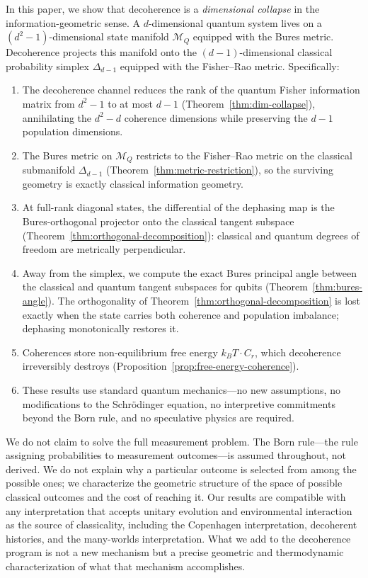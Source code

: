 \documentclass[12pt,a4paper]{article}
\theoremstyle{definition}
\theoremstyle{remark}
\begin{document}
In this paper, we show that decoherence is a \emph{dimensional collapse} in the information-geometric sense. A $d$-dimensional quantum system lives on a $(d^2-1)$-dimensional state manifold $\mathcal{M}_Q$ equipped with the Bures metric. Decoherence projects this manifold onto the $(d-1)$-dimensional classical probability simplex $\Delta_{d-1}$ equipped with the Fisher--Rao metric. Specifically:
\begin{enumerate}
\item The decoherence channel reduces the rank of the quantum Fisher information matrix from $d^2-1$ to at most $d-1$ (Theorem~\ref{thm:dim-collapse}), annihilating the $d^2-d$ coherence dimensions while preserving the $d-1$ population dimensions.
\item The Bures metric on $\mathcal{M}_Q$ restricts to the Fisher--Rao metric on the classical submanifold $\Delta_{d-1}$ (Theorem~\ref{thm:metric-restriction}), so the surviving geometry is exactly classical information geometry.
\item At full-rank diagonal states, the differential of the dephasing map is the Bures-orthogonal projector onto the classical tangent subspace (Theorem~\ref{thm:orthogonal-decomposition}): classical and quantum degrees of freedom are metrically perpendicular.
\item Away from the simplex, we compute the exact Bures principal angle between the classical and quantum tangent subspaces for qubits (Theorem~\ref{thm:bures-angle}).  The orthogonality of Theorem~\ref{thm:orthogonal-decomposition} is lost exactly when the state carries both coherence and population imbalance; dephasing monotonically restores it.
\item Coherences store non-equilibrium free energy $k_B T \cdot C_r$, which decoherence irreversibly destroys (Proposition~\ref{prop:free-energy-coherence}).
\item These results use standard quantum mechanics---no new assumptions, no modifications to the Schr\"odinger equation, no interpretive commitments beyond the Born rule, and no speculative physics are required.
\end{enumerate}

We do not claim to solve the full measurement problem. The Born rule---the rule assigning probabilities to measurement outcomes---is assumed throughout, not derived. We do not explain why a particular outcome is selected from among the possible ones; we characterize the geometric structure of the space of possible classical outcomes and the cost of reaching it. Our results are compatible with any interpretation that accepts unitary evolution and environmental interaction as the source of classicality, including the Copenhagen interpretation, decoherent histories, and the many-worlds interpretation. What we add to the decoherence program is not a new mechanism but a precise geometric and thermodynamic characterization of what that mechanism accomplishes.
\end{document}
